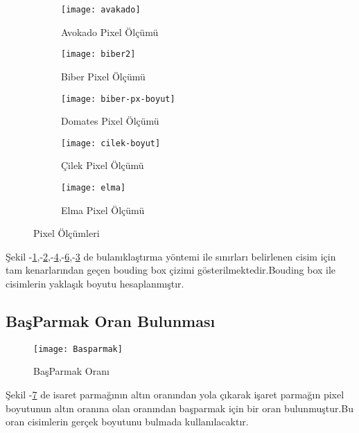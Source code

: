 \documentclass[11pt,a4paper]{report}
\begin{document}
\begin{justify}
\begin{figure} [!h]
  		\begin{subfigure}[t]{0.38\linewidth}
  			\centering
  			\texttt{[image: avakado]}
  			\caption{Avokado Pixel Ölçümü}
  			\label{avakado}
  		\end{subfigure}\hfill
  		\begin{subfigure}[t]{0.36\linewidth}
  			\centering
  			\texttt{[image: biber2]}
  			\caption{Biber Pixel Ölçümü}
  			\label{biber2}
  		\end{subfigure}
  		
  		\vspace{0.1cm} %
  		
  		\begin{subfigure}[t]{0.38\linewidth}
  			\centering
  			\texttt{[image: biber-px-boyut]}
  			\caption{Domates Pixel Ölçümü}
  			\label{biber}
  		\end{subfigure}\hfill
  		\begin{subfigure}[t]{0.38\linewidth}
  			\centering
  			\texttt{[image: cilek-boyut]}
  			\caption{Çilek Pixel Ölçümü}
  			\label{cilek}
  		\end{subfigure}
  		\begin{subfigure}[t]{0.38\linewidth}
  			\centering
  			\texttt{[image: elma]}
  			\caption{Elma Pixel Ölçümü}
  			\label{elma}
  		\end{subfigure}
  		

  		\caption{Pixel Ölçümleri}
  	\end{figure}
  	
  	 Şekil -\ref{avakado},-\ref{biber2},-\ref{cilek},-\ref{elma},-\ref{biber} de bulanıklaştırma yöntemi ile sınırları belirlenen cisim için tam kenarlarından geçen bouding box çizimi gösterilmektedir.Bouding box ile cisimlerin yaklaşık boyutu hesaplanmıştır.\cite{Nesne-Boyutlandırma}\cite{Nesne-Boyutlandırma-pixel}
  \clearpage
  \subsection{BaşParmak Oran Bulunması}
  \begin{figure}[!h]
  	\centering
  	\texttt{[image: Basparmak]}
  	\caption{BaşParmak Oranı}
  	\label{basparmak}
  \end{figure}
  Şekil -\ref{basparmak} de isaret parmağının altın oranından yola çıkarak işaret parmağın pixel boyutunun altın oranına olan oranından başparmak için bir oran bulunmuştur.Bu oran cisimlerin gerçek boyutunu bulmada kullanılacaktır.
  \newline
  

\end{justify}
\end{document}
